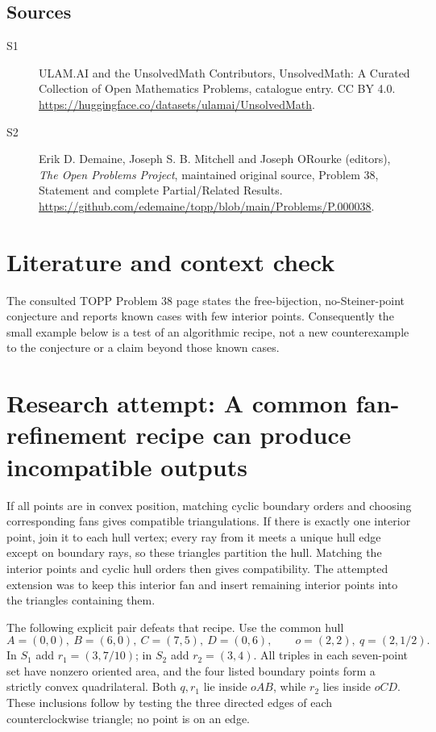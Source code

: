 \documentclass[11pt]{article}
\begin{document}
\subsection{Sources}
\begin{description}
\item[S1] ULAM.AI and the UnsolvedMath Contributors, UnsolvedMath: A Curated Collection of Open Mathematics Problems, catalogue entry. CC BY 4.0. \url{https://huggingface.co/datasets/ulamai/UnsolvedMath}.
\item[S2] Erik D. Demaine, Joseph S. B. Mitchell and Joseph O\textquotesingle Rourke (editors), \emph{The Open Problems Project}, maintained original source, Problem 38, Statement and complete Partial/Related Results. \url{https://github.com/edemaine/topp/blob/main/Problems/P.000038}.
\end{description}
\label{end:statement}

\section{Literature and context check}
The consulted TOPP Problem 38 page states the free-bijection, no-Steiner-point
conjecture and reports known cases with few interior points. Consequently the
small example below is a test of an algorithmic recipe, not a new counterexample
to the conjecture or a claim beyond those known cases.
\section{Research attempt: A common fan-refinement recipe can produce incompatible outputs}
If all points are in convex position, matching cyclic boundary orders and
choosing corresponding fans gives compatible triangulations. If there is exactly
one interior point, join it to each hull vertex; every ray from it meets a unique
hull edge except on boundary rays, so these triangles partition the hull. Matching
the interior points and cyclic hull orders then gives compatibility. The attempted
extension was to keep this interior fan and insert remaining interior points into
the triangles containing them.

The following explicit pair defeats that recipe. Use the common hull
\[
 A=(0,0),\ B=(6,0),\ C=(7,5),\ D=(0,6),
 \qquad o=(2,2),\ q=(2,1/2).
\]
In $S_1$ add $r_1=(3,7/10)$; in $S_2$ add $r_2=(3,4)$.
All triples in each seven-point set have nonzero oriented area, and the four
listed boundary points form a strictly convex quadrilateral. Both $q,r_1$ lie
inside $oAB$, while $r_2$ lies inside $oCD$. These inclusions follow by testing
the three directed edges of each counterclockwise triangle; no point is on an edge.
\end{document}
